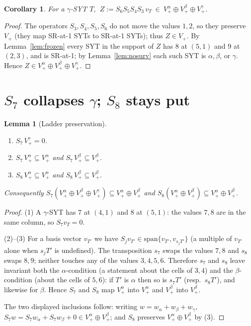 \documentclass[11pt]{article}
\newtheorem{lemma}{Lemma}
\newtheorem{corollary}{Corollary}
\newcommand{\Vp}{V_{+}}
\newcommand{\Va}{V_{+}^{\alpha}}
\newcommand{\Vb}{V_{+}^{\beta}}
\newcommand{\Vg}{V_{+}^{\gamma}}
\begin{document}
\begin{corollary}\label{cor:Zsupp}
For a $\gamma$-SYT $T$, $\ Z:=S_6S_5S_4S_3\,v_T\ \in\ \Va\oplus\Vb\oplus\Vg$.
\end{corollary}

\begin{proof}
The operators $S_3,S_4,S_5,S_6$ do not move the values $1,2$, so they preserve
$\Vp$ (they map SR-at-1 SYTs to SR-at-1 SYTs); thus $Z\in\Vp$. By
Lemma~\ref{lem:frozen} every SYT in the support of $Z$ has $8$ at $(5,1)$ and
$9$ at $(2,3)$, and is SR-at-1; by Lemma~\ref{lem:nosurv} each such SYT is
$\alpha,\beta$, or $\gamma$. Hence $Z\in\Va\oplus\Vb\oplus\Vg$.
\end{proof}

\section{$S_7$ collapses $\gamma$; $S_8$ stays put}

\begin{lemma}[Ladder preservation]\label{lem:ladder}
\leavevmode
\begin{enumerate}
\item $S_7\,\Vg = 0$.
\item $S_7\,\Va\subseteq\Va$ and $S_7\,\Vb\subseteq\Vb$.
\item $S_8\,\Va\subseteq\Va$ and $S_8\,\Vb\subseteq\Vb$.
\end{enumerate}
Consequently $S_7(\Va\oplus\Vb\oplus\Vg)\subseteq\Va\oplus\Vb$ and
$S_8(\Va\oplus\Vb)\subseteq\Va\oplus\Vb$.
\end{lemma}

\begin{proof}
(1) A $\gamma$-SYT has $7$ at $(4,1)$ and $8$ at $(5,1)$: the values $7,8$ are
in the same column, so $S_7 v_T = 0$.

(2)--(3) For a basis vector $v_{T'}$ we have $S_j v_{T'}\in
\mathrm{span}\{v_{T'},v_{s_j T'}\}$ (a multiple of $v_{T'}$ alone when $s_jT'$
is undefined). The transposition $s_7$ swaps the values $7,8$ and $s_8$ swaps
$8,9$; neither touches any of the values $3,4,5,6$. Therefore $s_7$ and $s_8$
leave invariant both the $\alpha$-condition (a statement about the cells of
$3,4$) and the $\beta$-condition (about the cells of $5,6$): if $T'$ is
$\alpha$ then so is $s_7T'$ (resp.\ $s_8T'$), and likewise for $\beta$. Hence
$S_7$ and $S_8$ map $\Va$ into $\Va$ and $\Vb$ into $\Vb$.

The two displayed inclusions follow: writing $w=w_\alpha+w_\beta+w_\gamma$,
$S_7w = S_7w_\alpha + S_7w_\beta + 0 \in \Va\oplus\Vb$; and $S_8$ preserves
$\Va\oplus\Vb$ by (3).
\end{proof}
\end{document}
